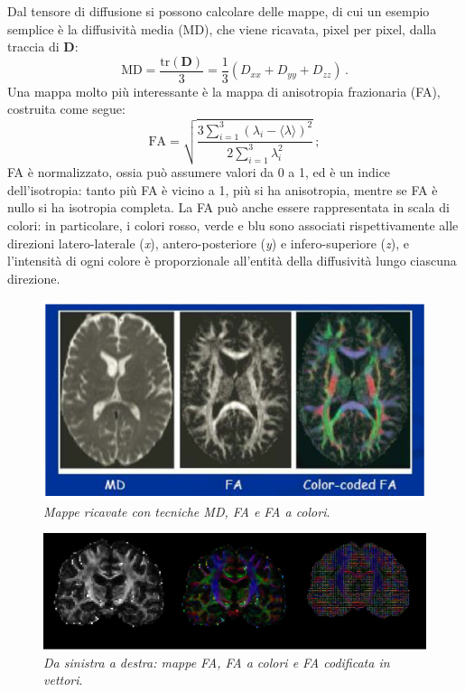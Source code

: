 \documentclass{report}
\numberwithin{equation}{section}
\numberwithin{figure}{section}
\renewcommand{\Vec}{\bm}
\begin{document}
Dal tensore di diffusione si possono calcolare delle mappe, di cui un esempio semplice è la diffusività media (MD), che viene ricavata, pixel per pixel, dalla traccia di $\Vec{D}$:
\begin{equation}
    \text{MD} = \frac{\text{tr}(\Vec{D})}{3} = \frac{1}{3}\left(D_{xx} + D_{yy} + D_{zz}\right)\,.
\end{equation}
Una mappa molto più interessante è la mappa di anisotropia frazionaria (FA), costruita come segue:
\begin{equation}
    \text{FA} = \sqrt{\frac{3 \sum_{i=1}^3 (\lambda_i - \langle \lambda \rangle)^2}{2 \sum_{i=1}^3 \lambda_i^2}}\,;
\end{equation}
FA è normalizzato, ossia può assumere valori da 0 a 1, ed è un indice dell'isotropia: tanto più FA è vicino a 1, più si ha anisotropia, mentre se FA è nullo si ha isotropia completa. La FA può anche essere rappresentata in scala di colori: in particolare, i colori rosso, verde e blu sono associati rispettivamente alle direzioni latero-laterale (\textit{x}), antero-posteriore (\textit{y}) e infero-superiore (\textit{z}), e l'intensità di ogni colore è proporzionale all'entità della diffusività lungo ciascuna direzione.

\begin{figure}[htp]
\centering
\includegraphics{immagini/colori.png}
\caption{\label{fig:colori} \textit{Mappe ricavate con tecniche MD, FA e FA a colori}.}
\end{figure}

\begin{figure}[htp]
\centering
\includegraphics[scale=0.67]{immagini/fa.png}
\caption{\label{fig:fa} \textit{Da sinistra a destra: mappe FA, FA a colori e FA codificata in vettori}.}
\end{figure}
\end{document}
